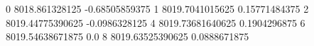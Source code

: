 0 8018.861328125 -0.68505859375
1 8019.7041015625 0.15771484375
2 8019.44775390625 -0.0986328125
4 8019.73681640625 0.1904296875
6 8019.54638671875 0.0
8 8019.63525390625 0.0888671875
